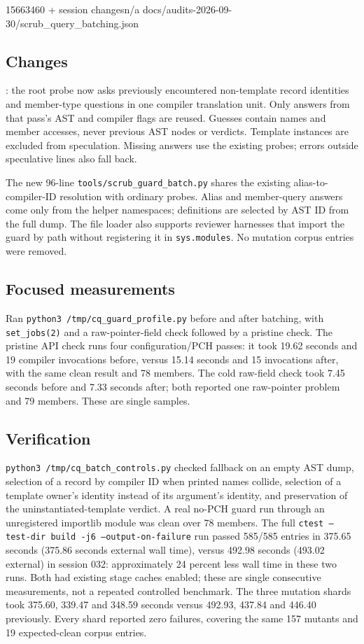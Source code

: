 %
  {15663460 + session changes}{n/a}%
  {docs/audits-2026-09-30/scrub\_query\_batching.json}

\subsection*{Changes}
: the root probe now asks previously encountered
non-template record identities and member-type questions in one compiler
translation unit. Only answers from that pass's AST and compiler flags are
reused. Guesses contain names and member accesses, never previous AST nodes or
verdicts. Template instances are excluded from speculation. Missing answers
use the existing probes; errors outside speculative lines also fall back.

The new 96-line \texttt{tools/scrub\_guard\_batch.py} shares the existing
alias-to-compiler-ID resolution with ordinary probes. Alias and member-query
answers come only from the helper namespaces; definitions are selected by AST
ID from the full dump. The file loader also supports reviewer harnesses that
import the guard by path without registering it in \texttt{sys.modules}.
No mutation corpus entries were removed.

\subsection*{Focused measurements}
Ran \texttt{python3 /tmp/cq\_guard\_profile.py} before and after batching,
with \texttt{set\_jobs(2)} and a raw-pointer-field check followed by a pristine
check. The pristine API check runs four configuration/PCH passes: it took
19.62 seconds and 19 compiler invocations before, versus 15.14 seconds and
15 invocations after, with the same clean result and 78 members. The cold
raw-field check took 7.45 seconds before and 7.33 seconds after; both reported
one raw-pointer problem and 79 members. These are single samples.

\subsection*{Verification}
\texttt{python3 /tmp/cq\_batch\_controls.py} checked fallback on an empty AST
dump, selection of a record by compiler ID when printed names collide,
selection of a template owner's identity instead of its argument's identity,
and preservation of the uninstantiated-template verdict. A real no-PCH guard
run through an unregistered importlib module was clean over 78 members.
The full \texttt{ctest --test-dir build -j6 --output-on-failure} run passed
585/585 entries in 375.65 seconds (375.86 seconds external wall time), versus
492.98 seconds (493.02 external) in session 032: approximately 24 percent less
wall time in these two runs. Both had existing stage caches enabled; these are
single consecutive measurements, not a repeated controlled benchmark.
The three mutation shards took 375.60, 339.47 and 348.59 seconds versus
492.93, 437.84 and 446.40 previously. Every shard reported zero failures,
covering the same 157 mutants and 19 expected-clean corpus entries.


